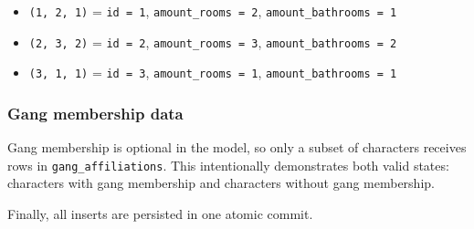 \begin{itemize}
\tightlist
\item
  \texttt{(1,\ 2,\ 1)} = \texttt{id\ =\ 1},
  \texttt{amount\_rooms\ =\ 2}, \texttt{amount\_bathrooms\ =\ 1}
\item
  \texttt{(2,\ 3,\ 2)} = \texttt{id\ =\ 2},
  \texttt{amount\_rooms\ =\ 3}, \texttt{amount\_bathrooms\ =\ 2}
\item
  \texttt{(3,\ 1,\ 1)} = \texttt{id\ =\ 3},
  \texttt{amount\_rooms\ =\ 1}, \texttt{amount\_bathrooms\ =\ 1}
\end{itemize}

\hypertarget{gang-membership-data}{%
\subsubsection{Gang membership data}\label{gang-membership-data}}

Gang membership is optional in the model, so only a subset of characters
receives rows in \texttt{gang\_affiliations}. This intentionally
demonstrates both valid states: characters with gang membership and
characters without gang membership.

\begin{Shaded}
\begin{Highlighting}[]
 
\NormalTok{    (}\NormalTok{, }\NormalTok{, }\NormalTok{),}
\NormalTok{    (}\NormalTok{, }\NormalTok{, }\NormalTok{),}
\NormalTok{    (}\NormalTok{, }\NormalTok{, }\NormalTok{),}
\NormalTok{    (}\NormalTok{, }\NormalTok{, }\NormalTok{);}
\end{Highlighting}
\end{Shaded}

Finally, all inserts are persisted in one atomic commit.

\begin{Shaded}
\begin{Highlighting}[]
\NormalTok{;}
\end{Highlighting}
\end{Shaded}

